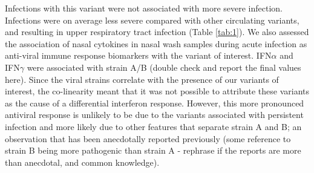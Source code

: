 \documentclass{article}
\begin{document}
Infections with this variant were not associated with more severe infection. Infections were on average less severe compared with other circulating variants, and resulting in upper respiratory tract infection (Table \ref{tab:1}). 
We also assessed the association of nasal cytokines in nasal wash samples during acute infection as anti-viral immune response biomarkers with the variant of interest.
IFN$\alpha$ and IFN$\gamma$ were associated with strain A/B
(double check and report the final values here). 
Since the viral strains correlate with the presence of our variants of interest, the co-linearity meant that it was not possible to attribute these variants as the cause of a differential interferon response.
However, this more pronounced antiviral response is unlikely to be due to the variants associated with persistent infection and more likely due to other features that separate strain A and B; an observation that has been anecdotally reported previously 
(some reference to strain B being more pathogenic than strain A - rephrase if the reports are more than anecdotal, and common knowledge). 








\end{document}
